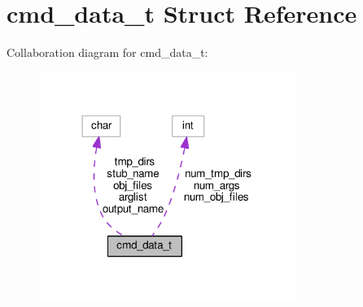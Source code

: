 \hypertarget{structcmd__data__t}{}\section{cmd\+\_\+data\+\_\+t Struct Reference}
\label{structcmd__data__t}


Collaboration diagram for cmd\+\_\+data\+\_\+t\+:
\nopagebreak
\begin{figure}[H]
\begin{center}
\leavevmode
\includegraphics[width=237pt]{structcmd__data__t__coll__graph}
\end{center}
\end{figure}
